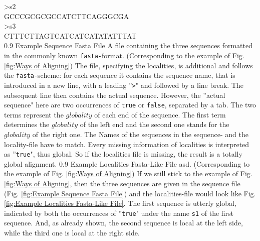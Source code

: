 \documentclass[a4paper,10pt]{thesis}
\begin{document}
{{{{{        >s2~~~~~~~~~~~~~~~~~~~~~~~~~~\\
        GCCCGCGCGCCATCTTCAGGGCGA~~~~~\\
        >s3~~~~~~~~~~~~~~~~~~~~~~~~~~\\
        CTTTCTTAGTCATCATCATATATTTAT~~\\}
      }
      {0.9\columnwidth}
      {Example Sequence Fasta File}
      {A file containing the three sequences formatted in the commonly known \texttt{fasta-}format. (Corresponding to the example of Fig. \ref{fig:Ways of Aligning})}%
      The file, specifying the localities, is additional and follows the \texttt{fasta-}scheme: for each sequence it contains the sequence name, that is introduced in a new line, with a leading ''\texttt{>}" and followed by a line break. The subsequent line then contains the actual sequence. However, the ''actual sequence" here are two occurrences of \texttt{true} or \texttt{false}, separated by a tab. The two terms represent the $globality$ of each end of the sequence. The first term determines the $globality$ of the left end and the second one stands for the $globality$ of the right one. The Names of the sequences in the sequence- and the locality-file have to match. Every missing information of localities is interpreted as ''\texttt{true}", thus global. So if the localities file is missing, the result is a totally global alignment. 
      {0.9\columnwidth}
      {Example Localities Fasta-Like File}
      {asd. (Corresponding to the example of Fig. \ref{fig:Ways of Aligning})}%
      If we still stick to the example of Fig. \ref{fig:Ways of Aligning}, then the three sequences are given in the sequence file (Fig. \ref{fig:Example Sequence Fasta File}) and the localities-file would look like Fig. \ref{fig:Example Localities Fasta-Like File}. The first sequence is utterly global, indicated by both the occurrences of ''\texttt{true}" under the name \texttt{s1} of the first sequence. And, as already shown, the second sequence is local at the left side, while the third one is local at the right side.
    }
  }
  }
\end{document}
